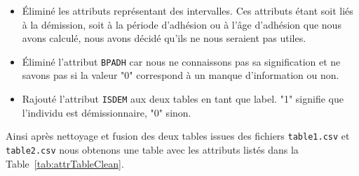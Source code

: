 \documentclass{ceri/sty/rapport}
\begin{document}
\begin{itemize}
    \item Éliminé les attributs représentant des intervalles. Ces attributs étant soit liés à la démission, soit à la période d'adhésion ou à l'âge d'adhésion que nous avons calculé, nous avons décidé qu'ils ne nous seraient pas utiles.\\
    
    \item Éliminé l'attribut \texttt{BPADH} car nous ne connaissons pas sa signification et ne savons pas si la valeur "0" correspond à un manque d'information ou non.\\
    
    \item Rajouté l'attribut \texttt{ISDEM} aux deux tables en tant que label. "1" signifie que l'individu est démissionnaire, "0" sinon.
\end{itemize}

Ainsi après nettoyage et fusion des deux tables issues des fichiers \texttt{table1.csv} et \texttt{table2.csv} nous obtenons une table avec les attributs listés dans la Table~\ref{tab:attrTableClean}.
\end{document}
